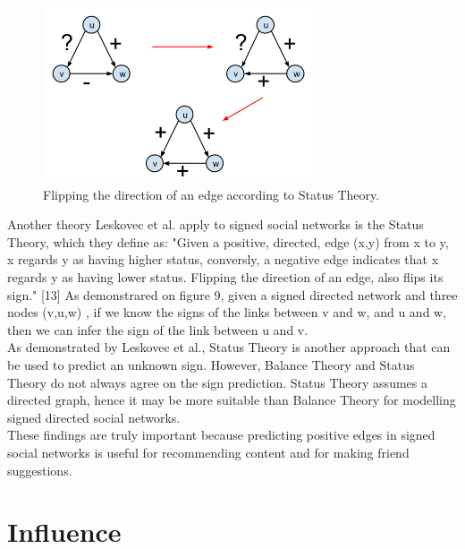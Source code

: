 \documentclass[conference,letterpaper]{IEEEtran}
\begin{document}
\begin{center}
\begin{figure}[hb]
\centering
\includegraphics[width=3.2in]{status_theory}
\caption{
Flipping the direction of an edge according to Status Theory.
}
\label{fig_sim}
\end{figure}
\end{center}

Another theory Leskovec et al. apply to signed social networks is the Status Theory, which they define as: "Given a positive, directed, edge (x,y) from x to y, x regards y as having higher status, conversly, a negative edge indicates that x regards y as having lower status. Flipping the direction of an edge, also flips its sign." [13] As demonstrared on figure 9, given a signed directed network and three nodes (v,u,w) , if we know the signs of the links between v and w, and u and w, then we can infer the sign of the link between u and v. \\
As demonstrated by Leskovec et al., Status Theory is another approach that can be used to predict an unknown sign. However, Balance Theory and Status Theory do not always agree on the sign prediction. Status Theory assumes a directed graph, hence it may be more suitable than Balance Theory for modelling signed directed social networks.\\
These findings are truly important because predicting positive edges in signed social networks is useful for recommending content and for making friend suggestions.\\

\section{Influence}
\end{document}
